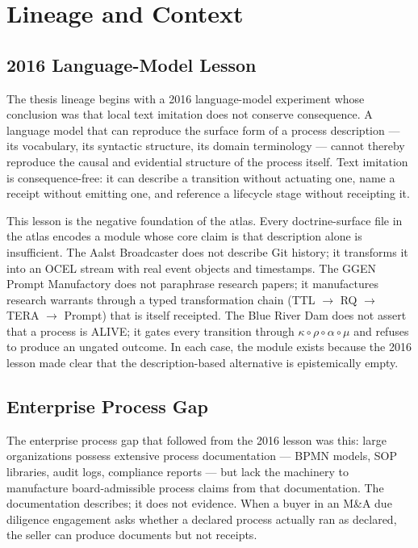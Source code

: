
\section{Lineage and Context}
\label{sec:atlas-lineage}

\subsection{2016 Language-Model Lesson}
\label{sec:atlas-lineage-2016}

The thesis lineage begins with a 2016 language-model experiment whose conclusion
was that local text imitation does not conserve consequence. A language model
that can reproduce the surface form of a process description --- its vocabulary,
its syntactic structure, its domain terminology --- cannot thereby reproduce the
causal and evidential structure of the process itself. Text imitation is
consequence-free: it can describe a transition without actuating one, name a
receipt without emitting one, and reference a lifecycle stage without
receipting it.

This lesson is the negative foundation of the atlas. Every doctrine-surface file
in the atlas encodes a module whose core claim is that description alone is
insufficient. The Aalst Broadcaster does not describe Git history; it transforms
it into an OCEL stream with real event objects and timestamps. The GGEN Prompt
Manufactory does not paraphrase research papers; it manufactures research
warrants through a typed transformation chain (TTL $\to$ RQ $\to$ TERA $\to$
Prompt) that is itself receipted. The Blue River Dam does not assert that a
process is ALIVE; it gates every transition through $\kappa \circ \rho \circ
\alpha \circ \mu$ and refuses to produce an ungated outcome. In each case, the
module exists because the 2016 lesson made clear that the description-based
alternative is epistemically empty.

\subsection{Enterprise Process Gap}
\label{sec:atlas-lineage-gap}

The enterprise process gap that followed from the 2016 lesson was this: large
organizations possess extensive process documentation --- BPMN models, SOP
libraries, audit logs, compliance reports --- but lack the machinery to
manufacture board-admissible process claims from that documentation. The
documentation describes; it does not evidence. When a buyer in an M\&A due
diligence engagement asks whether a declared process actually ran as declared,
the seller can produce documents but not receipts.

